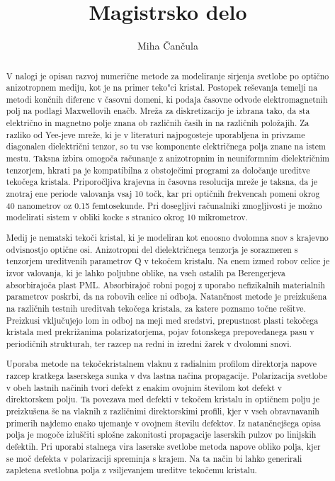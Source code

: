 \documentclass[a4paper,10pt]{article}
\title{Magistrsko delo}
\author{Miha \v Can\v cula}
\begin{document}
\maketitle

\begin{abstract}
V nalogi je opisan razvoj numerične metode za modeliranje sirjenja svetlobe po optično anizotropnem mediju, kot je na primer teko"ci kristal. 
Postopek reševanja temelji na metodi končnih diferenc v časovni domeni, ki podaja časovne odvode elektromagnetnih polj na podlagi Maxwellovih enačb. 
Mreža za diskretizacijo je izbrana tako, da sta električno in magnetno polje znana ob različnih časih in na različnih položajih. 
Za razliko od Yee-jeve mreže, ki je v literaturi najpogosteje uporabljena in privzame diagonalen dielektrični tenzor, so tu vse komponente električnega polja znane na istem mestu. 
Taksna izbira omogoča računanje z anizotropnim in neuniformnim dielektričnim tenzorjem, hkrati pa je kompatibilna z obstoječimi programi za določanje ureditve tekočega kristala. 
Priporočljiva krajevna in časovna resolucija mreže je taksna, da je znotraj ene periode valovanja vsaj 10 točk, kar pri optičnih frekvencah pomeni okrog 40 nanometrov oz 0.15 femtosekunde. 
Pri dosegljivi računalniki zmogljivosti je možno modelirati sistem v obliki kocke s stranico okrog 10 mikrometrov.

Medij je nematski tekoči kristal, ki je modeliran kot enoosno dvolomna snov s krajevno odvisnostjo optične osi. 
Anizotropni del dielektričnega tenzorja je sorazmeren s tenzorjem ureditvenih parametrov Q v tekočem kristalu. 
Na enem izmed robov celice je izvor valovanja, ki je lahko poljubne oblike, na vseh ostalih pa Berengerjeva absorbirajoča plast PML. 
Absorbirajoč robni pogoj z uporabo nefizikalnih materialnih parametrov poskrbi, da na robovih celice ni odboja. 
Natančnost metode je preizkušena na različnih testnih ureditvah tekočega kristala, za katere poznamo točne rešitve. 
Preizkusi vključujejo lom in odboj na meji med sredstvi, prepustnost plasti tekočega kristala med prekrižanima polarizatorjema, pojav fotonskega prepovedanega pasu v periodičnih strukturah, ter razcep na redni in izredni žarek v dvolomni snovi.

Uporaba metode na tekočekristalnem vlaknu z radialnim profilom direktorja napove razcep kratkega laserskega sunka v dva lastna načina propagacije. 
Polarizacija svetlobe v obeh lastnih načinih tvori defekt z enakim ovojnim številom kot defekt v direktorskem polju. 
Ta povezava med defekti v tekočem kristalu in optičnem polju je preizkušena še na vlaknih z različnimi direktorskimi profili, kjer v vseh obravnavanih primerih najdemo enako ujemanje v ovojnem številu defektov. 
Iz natančnejšega opisa polja je mogoče izluščiti splošne zakonitosti propagacije laserskih pulzov po linijskih defektih. 
Pri uporabi stalnega vira laserske svetlobe metoda napove obliko polja, kjer se moč defekta v polarizaciji spreminja s krajem. 
Na ta način bi lahko generirali zapletena svetlobna polja z vsiljevanjem ureditve tekočemu kristalu.
\end{abstract}
\end{document}

